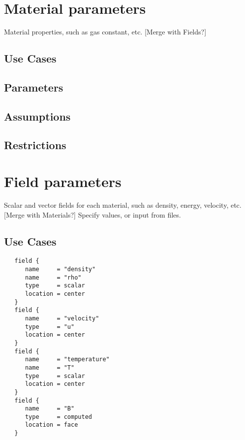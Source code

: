 \documentclass{book}
\begin{document}
\section{Material parameters} \label{s:material}

 Material properties, such as gas constant, etc.
 [Merge with Fields?]

\subsection{Use Cases}
\subsection{Parameters}
\subsection{Assumptions}
\subsection{Restrictions}

\section{Field parameters} \label{s:field}

Scalar and vector fields for each material, such as
 density, energy, velocity, etc.  [Merge with Materials?]  Specify
 values, or input from files.

\subsection{Use Cases}
\begin{verbatim}
   field {
      name     = "density"
      name     = "rho"
      type     = scalar
      location = center
   }
   field {
      name     = "velocity"
      type     = "u"
      location = center
   }
   field {
      name     = "temperature"
      name     = "T"
      type     = scalar
      location = center
   }
   field {
      name     = "B"
      type     = computed
      location = face
   }
\end{verbatim}
\end{document}
